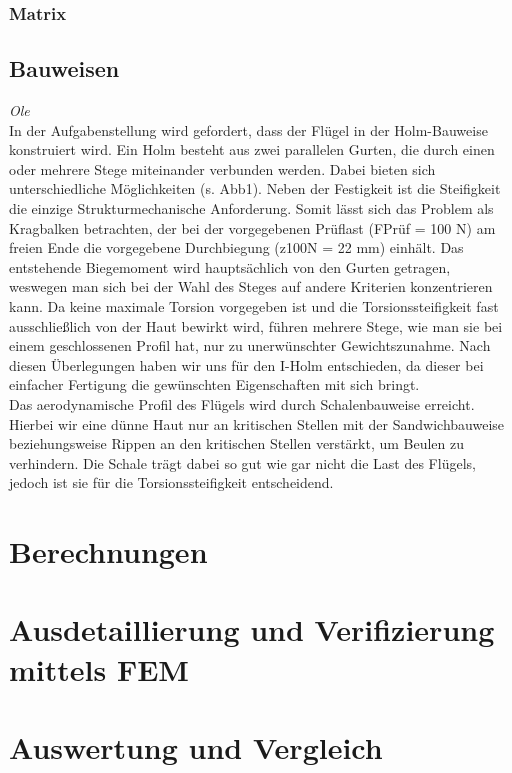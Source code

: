 \documentclass[a4paper,12p]{article}
\begin{document}
\subsubsection{Matrix}
\subsection{Bauweisen} 
\textit{Ole} \\
In der Aufgabenstellung wird gefordert, dass der Flügel in der Holm-Bauweise konstruiert wird. Ein Holm besteht aus zwei parallelen Gurten, die durch einen oder mehrere Stege miteinander verbunden werden. Dabei bieten sich unterschiedliche Möglichkeiten (s. Abb1). Neben der Festigkeit ist die Steifigkeit die einzige Strukturmechanische Anforderung. Somit lässt sich das Problem als Kragbalken betrachten, der bei der vorgegebenen Prüflast (FPrüf = 100 N) am freien Ende die vorgegebene Durchbiegung (z100N = 22 mm) einhält. Das entstehende Biegemoment wird hauptsächlich von den Gurten getragen, weswegen man sich bei der Wahl des Steges auf andere Kriterien konzentrieren kann. Da keine maximale Torsion vorgegeben ist und die Torsionssteifigkeit fast ausschließlich von der Haut bewirkt wird, führen mehrere Stege, wie man sie bei einem geschlossenen Profil hat, nur zu unerwünschter Gewichtszunahme. Nach diesen Überlegungen haben wir uns für den I-Holm entschieden, da dieser bei einfacher Fertigung die gewünschten Eigenschaften mit sich bringt.\\
Das aerodynamische Profil des Flügels wird durch Schalenbauweise erreicht. Hierbei wir eine dünne Haut nur an kritischen Stellen mit der Sandwichbauweise beziehungsweise Rippen an den kritischen Stellen verstärkt, um Beulen zu verhindern. Die Schale trägt dabei so gut wie gar nicht die Last des Flügels, jedoch ist sie für die Torsionssteifigkeit entscheidend.


\section{Berechnungen}

\section{Ausdetaillierung und Verifizierung mittels FEM }

\section{Auswertung und Vergleich}
\end{document}
